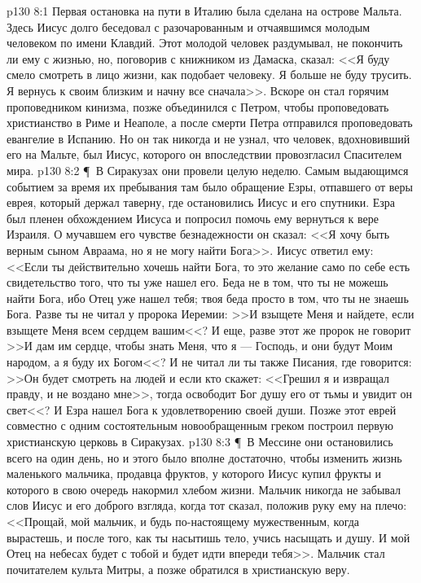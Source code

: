 \vs p130 8:1 Первая остановка на пути в Италию была сделана на острове Мальта. Здесь Иисус долго беседовал с разочарованным и отчаявшимся молодым человеком по имени Клавдий. Этот молодой человек раздумывал, не покончить ли ему с жизнью, но, поговорив с книжником из Дамаска, сказал: <<Я буду смело смотреть в лицо жизни, как подобает человеку. Я больше не буду трусить. Я вернусь к своим близким и начну все сначала>>. Вскоре он стал горячим проповедником кинизма, позже объединился с Петром, чтобы проповедовать христианство в Риме и Неаполе, а после смерти Петра отправился проповедовать евангелие в Испанию. Но он так никогда и не узнал, что человек, вдохновивший его на Мальте, был Иисус, которого он впоследствии провозгласил Спасителем мира.
\vs p130 8:2 \P\ В Сиракузах они провели целую неделю. Самым выдающимся событием за время их пребывания там было обращение Езры, отпавшего от веры еврея, который держал таверну, где остановились Иисус и его спутники. Езра был пленен обхождением Иисуса и попросил помочь ему вернуться к вере Израиля. О мучавшем его чувстве безнадежности он сказал: <<Я хочу быть верным сыном Авраама, но я не могу найти Бога>>. Иисус ответил ему: <<Если ты действительно хочешь найти Бога, то это желание само по себе есть свидетельство того, что ты уже нашел его. Беда не в том, что ты не можешь найти Бога, ибо Отец уже нашел тебя; твоя беда просто в том, что ты не знаешь Бога. Разве ты не читал у пророка Иеремии: >>И взыщете Меня и найдете, если взыщете Меня всем сердцем вашим<<? И еще, разве этот же пророк не говорит >>И дам им сердце, чтобы знать Меня, что я --- Господь, и они будут Моим народом, а я буду их Богом<<? И не читал ли ты также Писания, где говорится: >>Он будет смотреть на людей и если кто скажет: <<Грешил я и извращал правду, и не воздано мне>>, тогда освободит Бог душу его от тьмы и увидит он свет<<? И Езра нашел Бога к удовлетворению своей души. Позже этот еврей совместно с одним состоятельным новообращенным греком построил первую христианскую церковь в Сиракузах.
\vs p130 8:3 \P\ В Мессине они остановились всего на один день, но и этого было вполне достаточно, чтобы изменить жизнь маленького мальчика, продавца фруктов, у которого Иисус купил фрукты и которого в свою очередь накормил хлебом жизни. Мальчик никогда не забывал слов Иисус и его доброго взгляда, когда тот сказал, положив руку ему на плечо: <<Прощай, мой мальчик, и будь по\hyp{}настоящему мужественным, когда вырастешь, и после того, как ты насытишь тело, учись насыщать и душу. И мой Отец на небесах будет с тобой и будет идти впереди тебя>>. Мальчик стал почитателем культа Митры, а позже обратился в христианскую веру.
